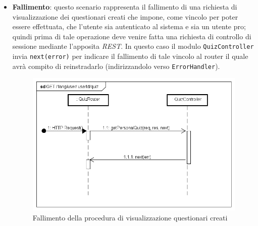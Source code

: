 \begin{itemize}
\item \textbf{Fallimento}: questo scenario rappresenta il fallimento di una richiesta di visualizzazione dei questionari creati che impone, come vincolo per poter essere effettuata, che l'utente sia autenticato al sistema e sia un utente pro; quindi prima di tale operazione deve venire fatta una richiesta di controllo di sessione mediante l'apposita \textit{REST}. In questo caso il modulo \texttt{QuizController} invia \texttt{next(error)} per indicare il fallimento di tale vincolo al router il quale avrà compito di reinstradarlo (indirizzandolo verso \texttt{ErrorHandler}).
\label{Fallimento della procedura di visualizzazione questionari creati}
\begin{figure}[ht]
	\centering
	\includegraphics[scale=0.40]{UML/DiagrammiDiSequenza/Back-end/GET__lang_user_userId_quiz_failure.png}
	\caption{Fallimento della procedura di visualizzazione questionari creati}
\end{figure}
\FloatBarrier
\end{itemize}


